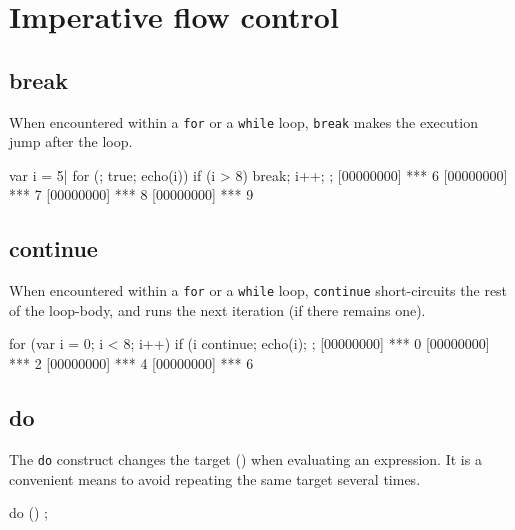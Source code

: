 
\section{Imperative flow control}

\subsection{break}

When encountered within a \lstinline|for| or a \lstinline|while| loop,
\lstinline|break| makes the execution jump after the loop.

\begin{urbiscript}
var i = 5|
for (; true; echo(i))
{
  if (i > 8)
    break;
  i++;
};
[00000000] *** 6
[00000000] *** 7
[00000000] *** 8
[00000000] *** 9
\end{urbiscript}

\subsection{continue}

When encountered within a \lstinline|for| or a \lstinline|while| loop,
\lstinline|continue| short-circuits the rest of the loop-body, and
runs the next iteration (if there remains one).

\begin{urbiscript}
for (var i = 0; i < 8; i++)
{
  if (i %
    continue;
  echo(i);
};
[00000000] *** 0
[00000000] *** 2
[00000000] *** 4
[00000000] *** 6
\end{urbiscript}

\subsection{do}

The \lstinline|do| construct changes the target (\this)
when evaluating an expression.  It is a convenient means to avoid
repeating the same target several times.

\begin{urbiunchecked}
do ()
{
};
\end{urbiunchecked}

